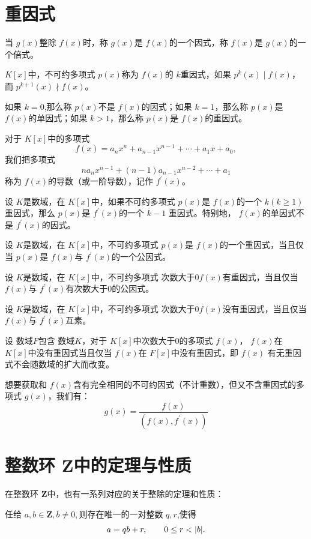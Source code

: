 \section{重因式}
当 $g(x)$整除 $f(x)$时，称 $g(x)$是 $f(x)$的一个因式，称 $f(x)$是 $g(x)$的一个倍式。 
\begin{mydef}[重因式]
    $K[x]$中，不可约多项式 $p(x)$称为 $f(x)$的 $k$重因式，如果 $p^k(x)\mid f(x)$，而 $p^{k+1}(x)\nmid f(x)$。
    
    如果 $k=0$,那么称 $p(x)$不是 $f(x)$的因式；如果 $k=1$，那么称 $p(x)$是 $f(x)$的单因式；如果 $k>1$，那么称 $p(x)$是 $f(x)$的重因式。
\end{mydef}
\begin{mydef}
    对于 $K[x]$中的多项式 
    \[f(x)=a_nx^n+a_{n-1}x^{n-1}+\cdots+a_1x+a_0,\]
    我们把多项式 
    \[na_nx^{n-1}+(n-1)a_{n-1}x^{n-2}+\cdots+a_1\]
    称为 $f(x)$的导数（或一阶导数），记作 $f^{\prime}(x)$。
\end{mydef}
\begin{mythm}
    设 $K$是数域，在 $K[x]$中，如果不可约多项式  $p(x)$是 $f(x)$的一个 $k(k\geq 1)$重因式，那么 $p(x)$是 $f^{\prime}(x)$的一个 $k-1$
    重因式。特别地， $f(x)$的单因式不是 $f^{\prime}(x)$的因式。
\end{mythm}
\begin{mycor}
    设 $K$是数域，在 $K[x]$中，不可约多项式  $p(x)$是 $f(x)$的一个重因式，当且仅当 $p(x)$是 $f(x)$与 $f^{\prime}(x)$的一个公因式。
\end{mycor}
\begin{mycor}
    设 $K$是数域，在 $K[x]$中，不可约多项式  次数大于0$f(x)$有重因式，当且仅当 $f(x)$与 $f^{\prime}(x)$有次数大于0的公因式。
\end{mycor}
\begin{mycor}
    设 $K$是数域，在 $K[x]$中，不可约多项式  次数大于0$f(x)$没有重因式，当且仅当 $f(x)$与 $f^{\prime}(x)$互素。
\end{mycor}
\begin{mycor}
    设 数域$F$包含 数域$K$，对于 $K[x]$中次数大于0的多项式 $f(x)$， $f(x)$在 $K[x]$中没有重因式当且仅当 $f(x)$在 $F[x]$中没有重因式，即 $f(x)$
    有无重因式不会随数域的扩大而改变。
\end{mycor}
想要获取和 $f(x)$含有完全相同的不可约因式（不计重数），但又不含重因式的多项式 $g(x)$，我们有：
\[g(x)=\frac{f(x)}{(f(x),f^{\prime}(x))}\]
\section{整数环 $\mathbf{Z}$中的定理与性质}
在整数环 $\mathbf{Z}$中，也有一系列对应的关于整除的定理和性质：
\begin{mythm}
    任给 $a,b\in \mathbf{Z},b\neq 0,$则存在唯一的一对整数 $q,r$,使得
    \[a=qb+r,\phantom{1111}0\leq r<\lvert b \rvert.\]
\end{mythm}